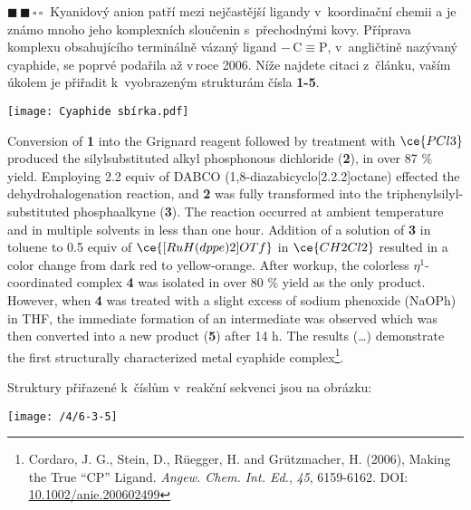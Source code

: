\documentclass{book}
\newcommand{\dva}{$\blacksquare \, \blacksquare \, \square \, \square \; \; $}
\renewenvironment{quotation}{\par}{\par} %
\begin{document}
\hrulefill %
\begin{quotation}
\dva Kyanidový anion patří mezi nejčastější ligandy v~koordinační chemii
a je známo mnoho jeho komplexních sloučenin s~přechodnými kovy. Příprava
komplexu obsahujícího terminálně vázaný ligand \linebreak{}
$\mathrm{{-\,C\equiv\hspace{0pt}P}}$, v~angličtině nazývaný cyaphide, se poprvé podařila
až v\,roce 2006. Níže najdete citaci z~článku, vaším úkolem je přiřadit
k~vyobrazeným strukturám čísla \textbf{1-5}.

\begin{center}
\texttt{[image: Cyaphide sbírka.pdf]}
\end{center}

Conversion of \textbf{1} into the Grignard reagent followed by treatment
with $\ce{PCl3}$ produced the silylsubstituted alkyl phosphonous
dichloride (\textbf{2}), in over 87 \% yield. Employing 2.2 equiv
of DABCO (1,8-diazabicyclo{[}2.2.2{]}octane) effected the dehydrohalogenation
reaction, and \textbf{2} was fully transformed into the triphenylsilyl-substituted
phos\-phaalkyne (\textbf{3}). The reaction occurred at ambient temperature
and in multiple solvents in less than one hour. Addition of a solution
of \textbf{3} in toluene to 0.5 equiv of $\ce{[RuH(dppe)2]OTf}$ in
$\ce{CH2Cl2}$ resulted in a color change from dark red to yellow-orange.
After workup, the colorless $\eta^{1}$-coordinated complex \textbf{4}
was isolated in over 80 \% yield as the only product. However, when
\textbf{4} was treated with a slight excess of sodium phenoxide (NaOPh)
in THF, the immediate formation of an intermediate was observed which
was then converted into a new product (\textbf{5}) after 14 h. The
results (\ldots) demonstrate the first structurally characterized metal
cyaphide complex\footnote{Cordaro, J. G., Stein, D., Rüegger, H. and Grützmacher, H. (2006),
Making the True “CP” Ligand. \textit{Angew. Chem. Int. Ed.}, \textit{45}, 6159-6162. DOI: 
\href{https://onlinelibrary.wiley.com/doi/full/10.1002/anie.200602499}{\underline{10.1002/anie.200602499}}}.
\end{quotation} \dotfill \par 
Struktury přiřazené k~číslům v~reakční sekvenci jsou na obrázku: 
\noindent \begin{center}

\texttt{[image: /4/6-3-5]}

\par\end{center}
\end{document}
